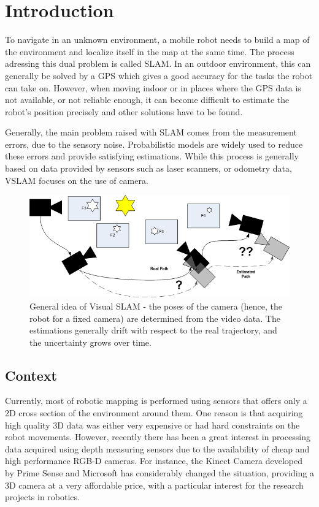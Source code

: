 \chapter{Introduction}

To navigate in an unknown environment, a mobile robot needs to build a map of the environment and localize itself in the map at the same time. The process adressing this dual problem is called \gls{SLAM}. In an outdoor environment, this can generally be solved by a GPS which gives a good accuracy for the tasks the robot can take on. However, when moving indoor or in places where the GPS data is not available, or not reliable enough, it can become difficult to estimate the robot's position precisely and other solutions have to be found. 

Generally, the main problem raised with \gls{SLAM} comes from the measurement errors, due to the sensory noise. Probabilistic models are widely used to reduce these errors and provide satisfying estimations. While this process is generally based on data provided by sensors such as laser scanners, or odometry data, \gls{VSLAM} focuses on the use of camera.

\begin{figure}[h!]
\begin{center}
\includegraphics[width=1.0\textwidth]{figures/visual_slam}
\caption{General idea of Visual SLAM - the poses of the camera (hence, the robot for a fixed camera) are determined from the video data. The estimations generally drift with respect to the real trajectory, and the uncertainty grows over time.}
\end{center}
\label{fig:vslam_overview}
\end{figure}

\section{Context}

Currently, most of robotic mapping is performed using sensors that offers only a 2D cross section of the environment around them. One reason is that acquiring high quality 3D data was either very expensive or had hard constraints on the robot movements. However, recently there has been a great interest in processing data acquired using depth measuring sensors due to the availability of cheap and high performance RGB-D cameras. For instance, the Kinect Camera developed by Prime Sense and Microsoft has considerably changed the situation, providing a 3D camera at a very affordable price, with a particular interest for the research projects in robotics.

